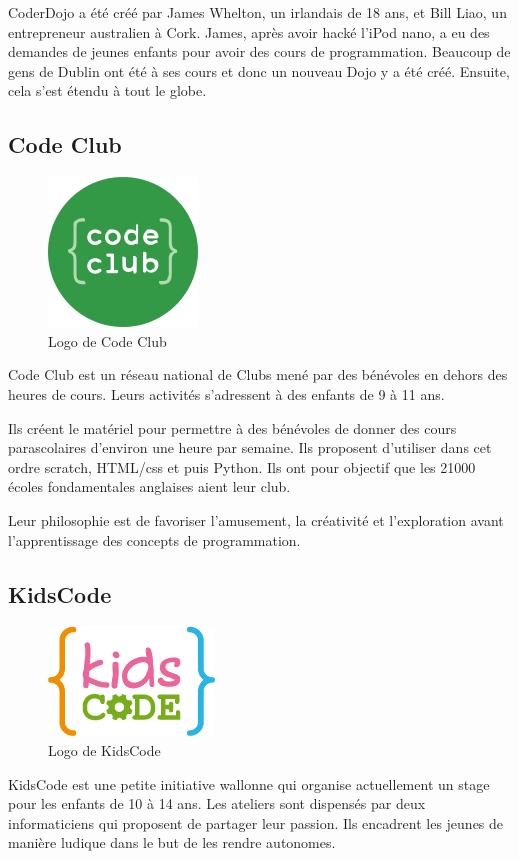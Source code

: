 CoderDojo a été créé par James Whelton, un irlandais de 18 ans, et Bill Liao, un entrepreneur australien à Cork. James, après avoir hacké l'iPod nano, a eu des demandes de jeunes enfants pour avoir des cours de programmation. Beaucoup de gens de Dublin ont été à ses cours et donc un nouveau Dojo y a été créé. Ensuite, cela s'est étendu à tout le globe.

\subsection{Code Club}
\begin{figure}[!ht]
  \begin{center}
    \includegraphics[scale=0.3]{content/5-related_work/images/club}
    \caption{Logo de Code Club}
    \label{fig:code club}
  \end{center}
\end{figure}
Code Club\cite{codeclub-about} est un réseau national de Clubs mené par des bénévoles en dehors des heures de cours. Leurs activités s'adressent à des enfants de 9 à 11 ans.

Ils créent le matériel pour permettre à des bénévoles de donner des cours parascolaires d'environ une heure par semaine. Ils proposent d'utiliser dans cet ordre scratch, HTML/css et puis Python. Ils ont pour objectif que les 21000 écoles fondamentales anglaises aient leur club.

Leur philosophie est de favoriser l'amusement, la créativité et l'exploration avant l'apprentissage des concepts de programmation.

\subsection{KidsCode}
\label{init-kidscode}
\begin{figure}[!ht]
  \begin{center}
    \includegraphics[scale=0.5]{content/5-related_work/images/kidscode}
    \caption{Logo de KidsCode}
    \label{fig:kidscode}
  \end{center}
\end{figure}
KidsCode \cite{kidscode} est une petite initiative wallonne qui organise actuellement un stage pour les enfants de 10 à 14 ans. Les ateliers sont dispensés par deux informaticiens qui proposent de partager leur passion. Ils encadrent les jeunes de manière ludique dans le but de les rendre autonomes.

